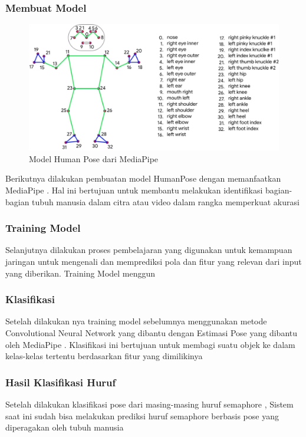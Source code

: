 \subsubsection{Membuat Model}
\begin{figure} [ht] \centering
  \includegraphics[scale=0.3]{gambar/humanpose.jpg}
  \caption{Model Human Pose dari MediaPipe}
  \label{fig:hasil}

\end{figure}
Berikutnya dilakukan pembuatan model HumanPose dengan memanfaatkan MediaPipe . Hal ini bertujuan untuk membantu melakukan identifikasi bagian-bagian tubuh manusia dalam citra atau video dalam rangka memperkuat akurasi 

\subsubsection{Training Model}
Selanjutnya dilakukan proses pembelajaran yang digunakan untuk  kemampuan jaringan untuk mengenali dan memprediksi pola dan fitur yang relevan dari input yang diberikan. Training Model menggun

\subsubsection{Klasifikasi}
Setelah dilakukan nya training model sebelumnya menggunakan metode Convolutional Neural Network yang dibantu dengan Estimasi Pose yang dibantu oleh MediaPipe . Klasifikasi ini bertujuan untuk membagi suatu objek ke dalam kelas-kelas tertentu berdasarkan fitur yang dimilikinya

\subsubsection{Hasil Klasifikasi Huruf}
Setelah dilakukan klasifikasi pose dari masing-masing huruf semaphore , Sistem saat ini sudah bisa melakukan prediksi huruf semaphore berbasis pose yang diperagakan oleh tubuh manusia  

